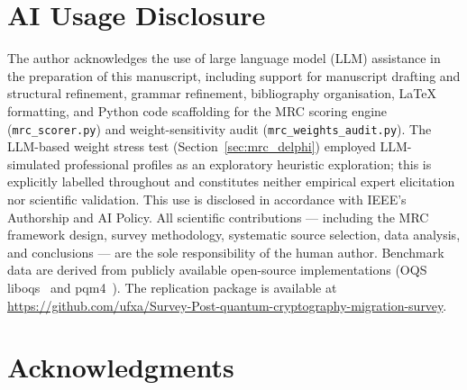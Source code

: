 \documentclass[journal]{IEEEtran}
\begin{document}
\section*{AI Usage Disclosure}

The author acknowledges the use of large language model (LLM) assistance in
the preparation of this manuscript, including support for manuscript drafting
and structural refinement, grammar refinement, bibliography organisation, LaTeX
formatting, and Python code scaffolding for the MRC scoring engine
(\texttt{mrc\_scorer.py}) and weight-sensitivity audit
(\texttt{mrc\_weights\_audit.py}). The LLM-based weight stress test
(Section~\ref{sec:mrc_delphi}) employed LLM-simulated professional profiles
as an exploratory heuristic exploration; this is explicitly labelled throughout
and constitutes neither empirical expert elicitation nor scientific validation. This use is disclosed in accordance with IEEE's Authorship
and AI Policy. All scientific contributions --- including the MRC framework
design, survey methodology, systematic source selection, data analysis, and
conclusions --- are the sole responsibility of the human author. Benchmark data
are derived from publicly available open-source implementations
(OQS liboqs~\cite{oqs2024} and pqm4~\cite{kannwischer2019pqm4}). The
replication package is available at \url{https://github.com/ufxa/Survey-Post-quantum-cryptography-migration-survey}.

\section*{Acknowledgments}

\end{document}
